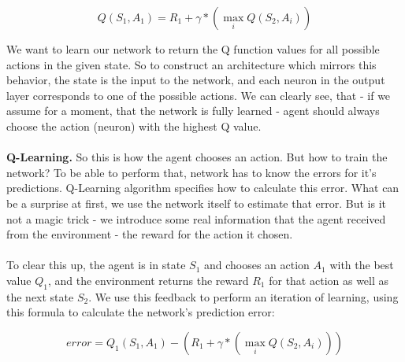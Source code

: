 \documentclass{article}
\begin{document}
\[ Q(S_{1}, A_{1}) = R_{1} + \gamma * (\max_{i} Q(S_{2}, A_{i}))\]

We want to learn our network to return the Q function values for all possible actions in the given state. So to construct an architecture which mirrors this behavior, the state is the input to the network, and each neuron in the output layer corresponds to one of the possible actions. We can clearly see, that - if we assume for a moment, that the network is fully learned - agent should always choose the action (neuron) with the highest Q value.
\\\\
\textbf{Q-Learning.} So this is how the agent chooses an action. But how to train the network? To be able to perform that, network has to know the errors for it's predictions. Q-Learning algorithm specifies how to calculate this error. What can be a surprise at first, we use the network itself to estimate that error. But is it not a magic trick - we introduce some real information that the agent received from the environment - the reward for the action it chosen. 
\\\\
To clear this up, the agent is in state $S_{1}$ and chooses an action $A_{1}$ with the best value $Q_{1}$, and the environment returns the reward $R_{1}$ for that action as well as the next state $S_{2}$. We use this feedback to perform an iteration of learning, using this formula to calculate the network's prediction error:

\[error = Q_{1}(S_{1}, A_{1}) - ( R_{1} + \gamma * (\max_{i} Q(S_{2}, A_{i})))\]
\end{document}
